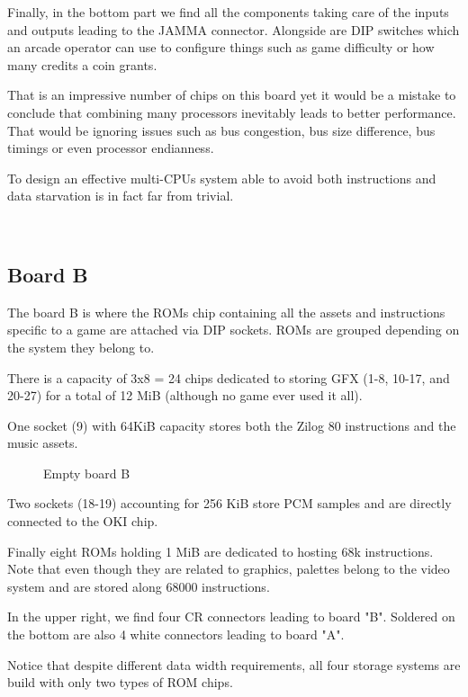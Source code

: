 Finally, in the bottom part we find all the components taking care of the inputs and outputs leading to the JAMMA connector. Alongside are DIP switches which an arcade operator can use to configure things such as game difficulty or how many credits a coin grants.

That is an impressive number of chips on this board yet it would be a mistake to conclude that combining many processors inevitably leads to better performance. That would be ignoring issues such as bus congestion, bus size difference, bus timings or even processor endianness. 

To design an effective multi-CPUs system able to avoid both instructions and data starvation is in fact far from trivial.


\
\label{fig:boarda}







\subsection{Board B}
   The board B is where the ROMs chip containing all the assets and instructions specific to a game are attached via DIP sockets. ROMs are grouped depending on the system they belong to. 

   There is a capacity of 3x8 = 24 chips dedicated to storing GFX (1-8, 10-17, and 20-27) for a total of 12 MiB (although no game ever used it all).

   One socket (9) with 64KiB capacity stores both the Zilog 80 instructions and the music assets.

 
\vfill
\begin{figure}[H]
  \caption*{Empty board B}
  \end{figure}

    Two sockets (18-19) accounting for 256 KiB store PCM samples and are directly connected to the OKI chip.

   Finally eight ROMs holding 1 MiB are dedicated to hosting 68k instructions. Note that even though they are related to graphics, palettes belong to the video system and are stored along 68000 instructions.

In the upper right, we find four CR connectors leading to board "B". Soldered on the bottom are also 4 white connectors leading to board "A". 


   Notice that despite different data width requirements, all four storage systems are build with only two types of ROM chips.

